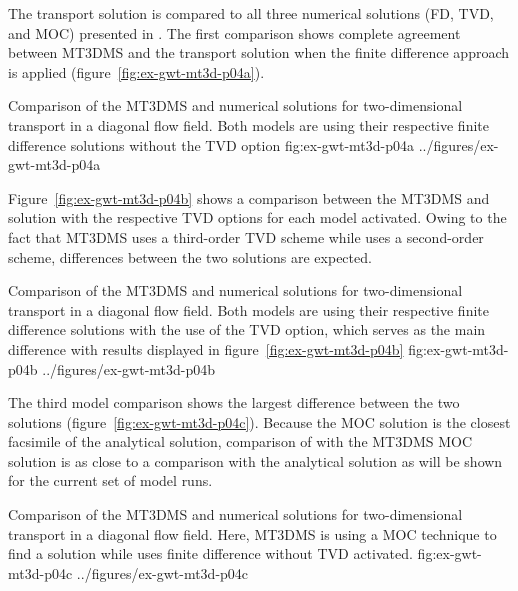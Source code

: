 The \mf transport solution is compared to all three numerical solutions (FD, TVD, and MOC) presented in \cite{zheng1999mt3dms}. The first comparison shows complete agreement between MT3DMS and the \mf transport solution when the finite difference approach is applied (figure~\ref{fig:ex-gwt-mt3d-p04a}). 

\begin{StandardFigure}
	{Comparison of the MT3DMS and \mf numerical solutions for two-dimensional transport in a diagonal flow field. Both models are using their respective finite difference solutions without the TVD option} 
	{fig:ex-gwt-mt3d-p04a}
	{../figures/ex-gwt-mt3d-p04a}
\end{StandardFigure}

Figure~\ref{fig:ex-gwt-mt3d-p04b} shows a comparison between the MT3DMS and \mf solution with the respective TVD options for each model activated.  Owing to the fact that MT3DMS uses a third-order TVD scheme while \mf uses a second-order scheme, differences between the two solutions are expected. 

\begin{StandardFigure}
	{Comparison of the MT3DMS and \mf numerical solutions for two-dimensional transport in a diagonal flow field. Both models are using their respective finite difference solutions with the use of the TVD option, which serves as the main difference with results displayed in figure~\ref{fig:ex-gwt-mt3d-p04b}} 
	{fig:ex-gwt-mt3d-p04b}
	{../figures/ex-gwt-mt3d-p04b}
\end{StandardFigure}

The third model comparison shows the largest difference between the two solutions (figure~\ref{fig:ex-gwt-mt3d-p04c}). Because the MOC solution is the closest facsimile of the analytical solution, comparison of \mf with the MT3DMS MOC solution is as close to a comparison with the analytical solution as will be shown for the current set of model runs. 

\begin{StandardFigure}
	{Comparison of the MT3DMS and \mf numerical solutions for two-dimensional transport in a diagonal flow field. Here, MT3DMS is using a MOC technique to find a solution while \mf uses finite difference without TVD activated.} 
	{fig:ex-gwt-mt3d-p04c}
	{../figures/ex-gwt-mt3d-p04c}
\end{StandardFigure}



